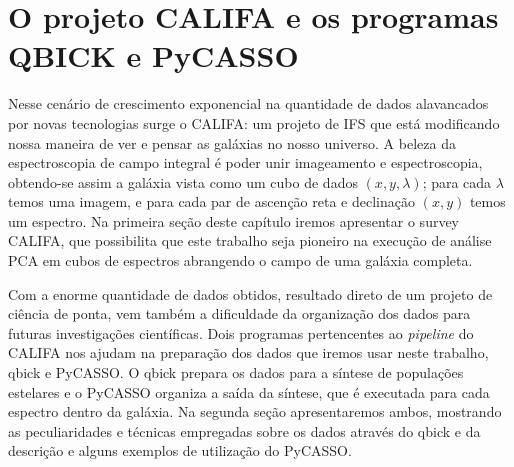 


\chapter{O projeto CALIFA e os programas QBICK e PyCASSO}
\label{sec:CALePyC}

Nesse cenário de crescimento exponencial na quantidade de dados alavancados por novas tecnologias surge o CALIFA: um
projeto de IFS que está modificando nossa maneira de ver e pensar as galáxias no nosso universo. A beleza da
espectroscopia de campo integral é poder unir imageamento e espectroscopia, obtendo-se assim a galáxia vista como um
cubo de dados $(x, y, \lambda)$; para cada $\lambda$ temos uma imagem, e para cada par de ascenção reta e declinação
$(x, y)$ temos um espectro. Na primeira seção deste capítulo iremos apresentar o survey CALIFA, que possibilita que este
trabalho seja pioneiro na execução de análise PCA em cubos de espectros abrangendo o campo de uma galáxia completa.

Com a enorme quantidade de dados obtidos, resultado direto de um projeto de ciência de ponta, vem também a dificuldade
da organização dos dados para futuras investigações científicas. Dois programas pertencentes ao {\em pipeline} do CALIFA
nos ajudam na preparação dos dados que iremos usar neste trabalho, {\sc qbick} e PyCASSO. O {\sc qbick} prepara os dados
para a síntese de populações estelares e o PyCASSO organiza a saída da síntese, que é executada para cada espectro
dentro da galáxia. Na segunda seção apresentaremos ambos, mostrando as peculiaridades e técnicas empregadas sobre os
dados através do {\sc qbick} e da descrição e alguns exemplos de utilização do PyCASSO.

